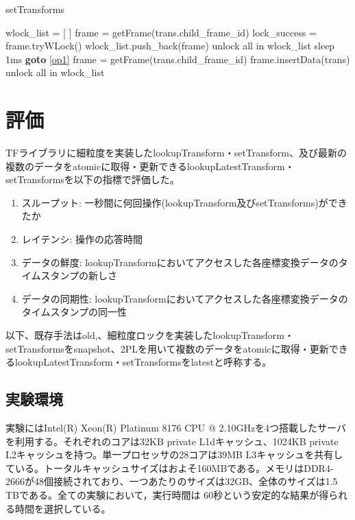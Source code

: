 \documentclass[a4paper]{jreport}	%
\begin{document}
\begin{algorithm}
\caption{setTransforms}\label{euclid}
\begin{algorithmic}[1]
	\State wlock\_list = [ ] \label{op1}
	\State frame = getFrame(trans.child\_frame\_id)
	\State lock\_success = frame.tryWLock()
	\State wlock\_list.push\_back(frame)
	\Else
	\State unlock all in wlock\_list
	\State sleep 1ms 
	\State \textbf{goto} \ref{op1}
	\EndIf
	\EndFor
	 
	\State frame = getFrame(trans.child\_frame\_id)
	\State frame.insertData(trans)
	\EndFor
	\State unlock all in wlock\_list
	\EndFunction
\end{algorithmic}
\end{algorithm}

\chapter{評価}
TFライブラリに細粒度を実装したlookupTransform・setTransform、及び最新の複数のデータをatomicに取得・更新できるlookupLatestTransform・setTransformsを以下の指標で評価した。

\begin{enumerate}
	\item スループット: 一秒間に何回操作(lookupTransform及びsetTransforms)ができたか
	\item レイテンシ: 操作の応答時間
	\item データの鮮度: lookupTransformにおいてアクセスした各座標変換データのタイムスタンプの新しさ
	\item データの同期性: lookupTransformにおいてアクセスした各座標変換データのタイムスタンプの同一性
\end{enumerate}

以下、既存手法はold,、細粒度ロックを実装したlookupTransform・setTransformsをsnapshot、2PLを用いて複数のデータをatomicに取得・更新できるlookupLatestTransform・setTransformsをlatestと呼称する。



\section{実験環境}

実験にはIntel(R) Xeon(R) Platinum 8176 CPU @ 2.10GHzを4つ搭載したサーバを利用する。それぞれのコアは32KB private L1dキャッシュ、1024KB private L2キャッシュを持つ。単一プロセッサの28コアは39MB L3キャッシュを共有している。トータルキャッシュサイズはおよそ160MBである。メモリはDDR4-2666が48個接続されており、一つあたりのサイズは32GB、全体のサイズは1.5 TBである。全ての実験において，実行時間は 60秒という安定的な結果が得られる時間を選択している。
\end{document}
